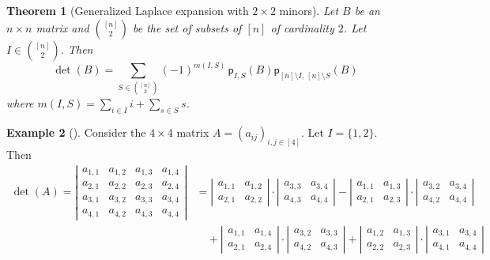 \documentclass[11pt]{amsart}
\newtheorem{theorem}{Theorem}[section]
\theoremstyle{remark}
\theoremstyle{remark}
\theoremstyle{definition}
\theoremstyle{definition}
\theoremstyle{definition}
\newtheorem{eg_no_qed}[theorem]{Example}
\newenvironment{ex}[1][]{\begin{eg_no_qed}[#1]\renewcommand{\qedsymbol}{$\Diamond$}\pushQED{\qed}}{\popQED\end{eg_no_qed}}
\numberwithin{equation}{section}
\newcommand{\pl}{\mathsf{p}}
\begin{document}
\begin{theorem}[Generalized Laplace expansion with $2\times 2$ minors] \label{thm.gen.laplace}
 Let $B$ be an $n\times n$ matrix and $\binom{[n]}{2}$ be the set of subsets of $[n]$ of cardinality $2$. Let $I\in\binom{[n]}{2}$. Then
 \begin{equation}\label{prop:GLE}
\det\left(B\right)=\sum_{S\in\binom{[n]}{2}} (-1)^{m(I,S)}\,\pl_{I, S}\left(B\right)\pl_{[n]\setminus I,\,[n]\setminus S}\left(B\right)
 \end{equation}
 where $m(I,S)=\sum_{i\in I} i+\sum_{s\in S}s$.
\end{theorem}

\begin{ex} Consider the $4\times 4$ matrix $A=(a_{ij})_{i,j\in [4]}$. Let $I = \{1,2\}$. Then
\begin{align*}
\det(A) = \left| \begin{matrix} a_{1,1} & a_{1,2} & a_{1,3} & a_{1,4} \\ a_{2,1} & a_{2,2} & a_{2,3} & a_{2,4} \\ a_{3,1} & a_{3,2} & a_{3,3} & a_{3,4}\\ a_{4,1} & a_{4,2} & a_{4,3} & a_{4,4}\end{matrix} \right| &= \left| \begin{matrix} a_{1,1} & a_{1,2}\\ a_{2,1} & a_{2,2} \end{matrix} \right| \cdot \left| \begin{matrix} a_{3,3} & a_{3,4}\\ a_{4,3} & a_{4,4} \end{matrix} \right| -  \left| \begin{matrix} a_{1,1} & a_{1,3}\\ a_{2,1} & a_{2,3} \end{matrix} \right| \cdot \left| \begin{matrix} a_{3,2} & a_{3,4}\\ a_{4,2} & a_{4,4} \end{matrix} \right| \\
&  \quad +   \left| \begin{matrix} a_{1,1} & a_{1,4}\\ a_{2,1} & a_{2,4} \end{matrix} \right| \cdot \left| \begin{matrix} a_{3,2} & a_{3,3}\\ a_{4,2} & a_{4,3} \end{matrix} \right| +  \left| \begin{matrix} a_{1,2} & a_{1,3}\\ a_{2,2} & a_{2,3} \end{matrix} \right| \cdot \left| \begin{matrix} a_{3,1} & a_{3,4}\\ a_{4,1} & a_{4,4} \end{matrix} \right| \\ \\

\end{align*}
\end{ex}
\end{document}

